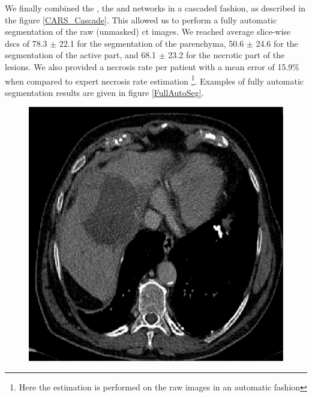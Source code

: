 We finally combined the , the  and  networks in a cascaded fashion, as described in the figure \ref{CARS_Cascade}. This allowed us to perform a fully automatic segmentation of the raw (unmasked) \ac{ct} images. We reached average slice-wise \ac{dsc}s of 78.3 $\pm$ 22.1 for the segmentation of the parenchyma, 50.6 $\pm$ 24.6  for the segmentation of the active part, and 68.1 $\pm$ 23.2 for the necrotic part of the lesions. We also provided a necrosis rate per patient with a mean error of 15.9\% when compared to expert necrosis rate estimation \footnote{Here the estimation is performed on the raw images in an automatic fashion}. Examples of fully automatic segmentation results are given in figure \ref{FullAutoSeg}.


\begin{figure}[!ht]
   \centering
\begin{minipage}{4cm}
\includegraphics[width=\linewidth]{../SemanticSeg/images/1_7_raw_new_resized}
\end{minipage} \hspace{-0.3cm}
\begin{minipage}{4cm}

\end{minipage}
\end{figure}
